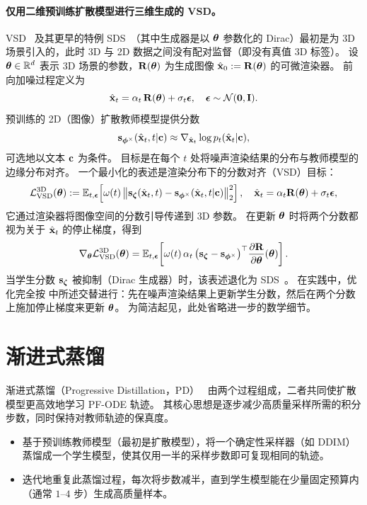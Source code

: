 \paragraph{仅用二维预训练扩散模型进行三维生成的 VSD。}
VSD~\citep{wang2023prolificdreamer} 及其更早的特例 SDS~\citep{pooledreamfusion}（其中生成器是以 ${\bm{\theta}}$ 参数化的 Dirac）最初是为 3D 场景引入的，此时 3D 与 2D 数据之间没有配对监督（即没有真值 3D 标签）。
设 ${\bm{\theta}}\in\mathbb{R}^d$ 表示 3D 场景的参数，${\mathbf{R}}({\bm{\theta}})$ 为生成图像 $\hat{{\mathbf{x}}}_0:={\mathbf{R}}({\bm{\theta}})$ 的可微渲染器。
前向加噪过程定义为
\[
\hat{{\mathbf{x}}}_t=\alpha_t\,{\mathbf{R}}({\bm{\theta}})+\sigma_t{\bm{\epsilon}},\quad {\bm{\epsilon}}\sim\mathcal N(\bm 0,{\mathbf{I}}).
\]
预训练的 2D（图像）扩散教师模型提供分数
\[
{\mathbf{s}}_{{\bm{\phi}}^\times}(\hat{{\mathbf{x}}}_t,t|{\mathbf{c}})\approx\nabla_{\hat{{\mathbf{x}}}_t}\log p_t(\hat{{\mathbf{x}}}_t|{\mathbf{c}}),
\]
可选地以文本 ${\mathbf{c}}$ 为条件。
目标是在每个 $t$ 处将噪声渲染结果的分布与教师模型的边缘分布对齐。
一个最小化的表述是渲染分布下的分数对齐（VSD）目标：
\[
\mathcal{L}^{\text{3D}}_{\text{VSD}}({\bm{\theta}})
:=\mathbb{E}_{t,{\bm{\epsilon}}}\!\left[\omega(t)\,\big\|
{\mathbf{s}}_{\bm{\zeta}}(\hat{{\mathbf{x}}}_t,t)-{\mathbf{s}}_{{\bm{\phi}}^\times}(\hat{{\mathbf{x}}}_t,t|{\mathbf{c}})
\big\|_2^2\right],
\quad \hat{{\mathbf{x}}}_t=\alpha_t{\mathbf{R}}({\bm{\theta}})+\sigma_t{\bm{\epsilon}},
\]
它通过渲染器将图像空间的分数引导传递到 3D 参数。
在更新 ${\bm{\theta}}$ 时将两个分数都视为关于 $\hat{{\mathbf{x}}}_t$ 的停止梯度，得到
\[
\nabla_{{\bm{\theta}}}\mathcal{L}^{\text{3D}}_{\text{VSD}}({\bm{\theta}})
=\mathbb{E}_{t,{\bm{\epsilon}}}\!\left[\omega(t)\,\alpha_t\,
\big({\mathbf{s}}_{\bm{\zeta}}-{\mathbf{s}}_{{\bm{\phi}}^\times}\big)^\top
\frac{\partial {\mathbf{R}}}{\partial{\bm{\theta}}}({\bm{\theta}})\right].
\]
当学生分数 ${\mathbf{s}}_{\bm{\zeta}}$ 被抑制（Dirac 生成器）时，该表述退化为 SDS~\citep{pooledreamfusion}。
在实践中，优化完全按  中所述交替进行：先在噪声渲染结果上更新学生分数，然后在两个分数上施加停止梯度来更新 ${\bm{\theta}}$。
为简洁起见，此处省略进一步的数学细节。




\clearpage
\newpage

\section{\texorpdfstring{渐进式蒸馏}{Progressive Distillation}}\label{sec:PD}


渐进式蒸馏（Progressive Distillation，PD）~\citep{salimans2021progressive} 由两个过程组成，二者共同使扩散模型更高效地学习 PF-ODE 轨迹。
其核心思想是逐步减少高质量采样所需的积分步数，同时保持对教师轨迹的保真度。
\begin{itemize}
    \item {} 基于预训练教师模型（最初是扩散模型），将一个确定性采样器（如 DDIM）蒸馏成一个学生模型，使其仅用一半的采样步数即可复现相同的轨迹。
    \item {} 迭代地重复此蒸馏过程，每次将步数减半，直到学生模型能在少量固定预算内（通常 $1$–$4$ 步）生成高质量样本。
\end{itemize}

